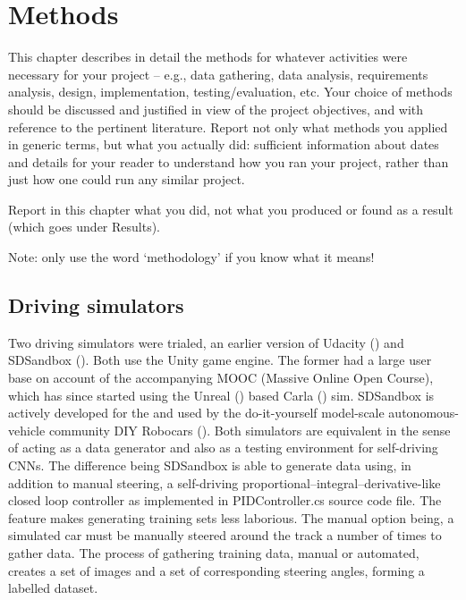 
\chapter{Methods}

\label{Methods} 

This chapter describes in detail the methods for whatever activities were necessary for your project – e.g., data gathering, data analysis, requirements analysis, design, implementation, testing/evaluation, etc. Your choice of methods should be discussed and justified in view of the project objectives, and with reference to the pertinent literature. Report not only what methods you applied in generic terms, but what you actually did: sufficient information about dates and details for your reader to understand how you ran your project, rather than just how one could run any similar project.  

Report in this chapter what you did, not what you produced or found as a 
result (which goes under Results).  
  
Note: only use the word ‘methodology’ if you know what it means!  


\section{Driving simulators}

Two driving simulators were trialed, an earlier version of Udacity (\cite{UdacityCarSim}) and SDSandbox (\cite{SDSandboxSim}). Both use the Unity game engine. The former had a large user base on account of the accompanying MOOC (Massive Online Open Course), which has since started using the Unreal (\cite{unrealengine}) based Carla (\cite{Dosovitskiy17}) sim. SDSandbox is actively developed for the \cite{DonkeyCar2020} and used by the do-it-yourself model-scale autonomous-vehicle community DIY Robocars (\cite{DIYRobocars2020}).
Both simulators are equivalent in the sense of acting as a data generator and also as a testing environment for self-driving CNNs. The difference being SDSandbox is able to generate data using, in addition to manual steering, a self-driving proportional–integral–derivative-like closed loop controller as implemented in PIDController.cs source code file. The feature makes generating training sets less laborious. The manual option being, a simulated car must be manually steered around the track a number of times to gather data. The process of gathering training data, manual or automated, creates a set of images and a set of corresponding steering angles, forming a labelled dataset.

